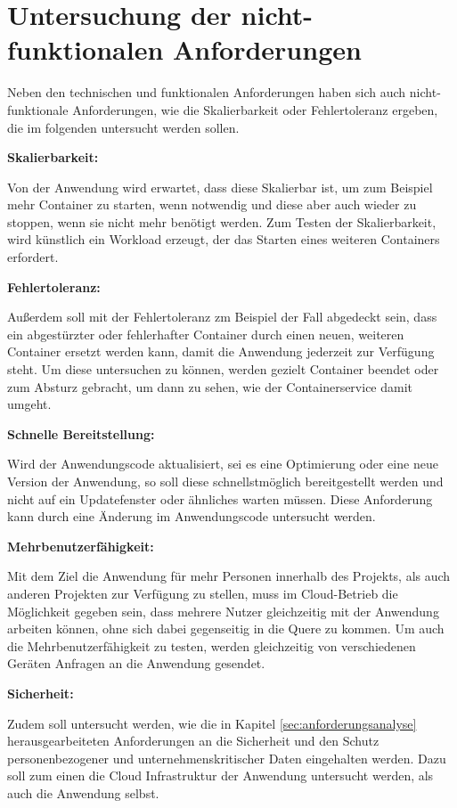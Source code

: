 \section{Untersuchung der nicht-funktionalen Anforderungen}
Neben den technischen und funktionalen Anforderungen haben sich auch nicht-funktionale Anforderungen, wie die Skalierbarkeit oder Fehlertoleranz ergeben, die im folgenden untersucht werden sollen.

\textbf{Skalierbarkeit:}

Von der Anwendung wird erwartet, dass diese Skalierbar ist, um zum Beispiel mehr Container zu starten, wenn notwendig und diese aber auch wieder zu stoppen, wenn sie nicht mehr benötigt werden. Zum Testen der Skalierbarkeit, wird künstlich ein Workload erzeugt, der das Starten eines weiteren Containers erfordert.

\textbf{Fehlertoleranz:}

Außerdem soll mit der Fehlertoleranz zm Beispiel der Fall abgedeckt sein, dass ein abgestürzter oder fehlerhafter Container durch einen neuen, weiteren Container ersetzt werden kann, damit die Anwendung jederzeit zur Verfügung steht. Um diese untersuchen zu können, werden gezielt Container beendet oder zum Absturz gebracht, um dann zu sehen, wie der Containerservice damit umgeht.

\textbf{Schnelle Bereitstellung:}

Wird der Anwendungscode aktualisiert, sei es eine Optimierung oder eine neue Version der Anwendung, so soll diese schnellstmöglich bereitgestellt werden und nicht auf ein Updatefenster oder ähnliches warten müssen. Diese Anforderung kann durch eine Änderung im Anwendungscode untersucht werden.

\textbf{Mehrbenutzerfähigkeit:}

Mit dem Ziel die Anwendung für mehr Personen innerhalb des Projekts, als auch anderen Projekten zur Verfügung zu stellen, muss im Cloud-Betrieb die Möglichkeit gegeben sein, dass mehrere Nutzer gleichzeitig mit der Anwendung arbeiten können, ohne sich dabei gegenseitig in die Quere zu kommen. Um auch die Mehrbenutzerfähigkeit zu testen, werden gleichzeitig von verschiedenen Geräten Anfragen an die Anwendung gesendet.

\textbf{Sicherheit:}

Zudem soll untersucht werden, wie die in Kapitel \ref{sec:anforderungsanalyse} herausgearbeiteten Anforderungen an die Sicherheit und den Schutz personenbezogener und unternehmenskritischer Daten eingehalten werden. Dazu soll zum einen die Cloud Infrastruktur der Anwendung untersucht werden, als auch die Anwendung selbst. \pagebreak